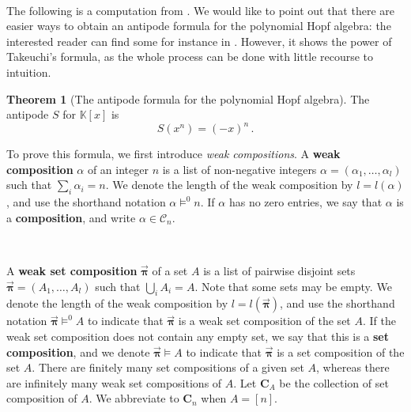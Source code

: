 \documentclass[12pt, reqno]{amsart}
\theoremstyle{definition}
\newtheorem{thm}{Theorem}[section]
\newcommand{\opi}{\vec{\boldsymbol{\pi}}}
\begin{document}
\

The following is a computation from \cite{BS2017}.
We would like to point out that there are easier ways to obtain an antipode formula for the polynomial Hopf algebra: the interested reader can find some for instance in \cite{GrinbergReiner}.
However, it shows the power of Takeuchi’s formula, as the whole process can be done with little recourse to intuition.


\begin{thm}[The antipode formula for the polynomial Hopf algebra]\label{thm:polyHA}
The antipode $S$ for $\mathbb{K}[x] $ is 
$$ S(x^n) =(-x)^n\, . $$
\end{thm}

To prove this formula, we first introduce \textit{weak compositions}.
A \textbf{weak composition} $\alpha$ of an integer $n$ is a list of non-negative integers $\alpha = (\alpha_1, \dots , \alpha_l)$ such that $\sum_i \alpha_i = n$.
We denote the length of the weak composition by $l = l(\alpha)$, and use the shorthand notation $\alpha \models^0 n$.
If $\alpha $ has no zero entries, we say that $\alpha$ is a \textbf{composition}, and write $\alpha \in \mathcal C_n$.

\

A \textbf{weak set composition} $\opi$ of a set $A$ is a list of pairwise disjoint sets $\opi = (A_1, \dots , A_l)$ such that $\bigcup_i A_i = A$.
Note that some sets may be empty.
We denote the length of the weak composition by $l= l(\opi)$, and use the shorthand notation $\opi \models^0 A$ to indicate that $\opi$ is a weak set composition of the set $A$.
If the weak set composition does not contain any empty set, we say that this is a \textbf{set composition}, and we denote $\opi \models A$ to indicate that $\opi$ is a set composition of the set $A$.
There are finitely many set compositions of a given set $A$, whereas there are infinitely many weak set compositions of $A$.
Let $\mathbf{C}_A$ be the collection of set composition of $A$.
We abbreviate to $\mathbf{C}_n$ when $A = [n]$.
\end{document}

